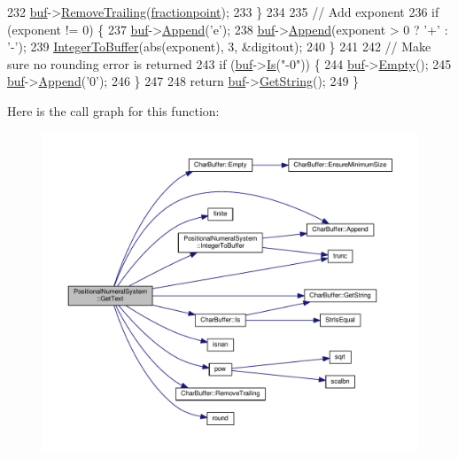 \begin{DoxyCode}
232         \hyperlink{classNumeralSystem_a03e7be944bf3fa5e4c34d80f135cd017}{buf}->\hyperlink{classCharBuffer_a1071772d1059263f4f880965fcc349ab}{RemoveTrailing}(\hyperlink{classPositionalNumeralSystem_ad986e454b020c21e70f2efbc3682e44f}{fractionpoint});
233     \}
234 
235     \textcolor{comment}{// Add exponent}
236     \textcolor{keywordflow}{if} (exponent != 0) \{
237         \hyperlink{classNumeralSystem_a03e7be944bf3fa5e4c34d80f135cd017}{buf}->\hyperlink{classCharBuffer_a045b38735f7b3007c1b98d3d7b7feafe}{Append}(\textcolor{charliteral}{'e'});
238         \hyperlink{classNumeralSystem_a03e7be944bf3fa5e4c34d80f135cd017}{buf}->\hyperlink{classCharBuffer_a045b38735f7b3007c1b98d3d7b7feafe}{Append}(exponent > 0 ? \textcolor{charliteral}{'+'} : \textcolor{charliteral}{'-'});
239         \hyperlink{classPositionalNumeralSystem_ac2edd0c7d5b47dc04908038f3eb03556}{IntegerToBuffer}(abs(exponent), 3, &digitout);
240     \}
241 
242     \textcolor{comment}{// Make sure no rounding error is returned}
243     \textcolor{keywordflow}{if} (\hyperlink{classNumeralSystem_a03e7be944bf3fa5e4c34d80f135cd017}{buf}->\hyperlink{classCharBuffer_a64988275bda43dddb6d2b3b9551cefb0}{Is}(\textcolor{stringliteral}{"-0"})) \{
244         \hyperlink{classNumeralSystem_a03e7be944bf3fa5e4c34d80f135cd017}{buf}->\hyperlink{classCharBuffer_abe39d3fd7d8b9c8ec343af2cae7adc96}{Empty}();
245         \hyperlink{classNumeralSystem_a03e7be944bf3fa5e4c34d80f135cd017}{buf}->\hyperlink{classCharBuffer_a045b38735f7b3007c1b98d3d7b7feafe}{Append}(\textcolor{charliteral}{'0'});
246     \}
247 
248     \textcolor{keywordflow}{return} \hyperlink{classNumeralSystem_a03e7be944bf3fa5e4c34d80f135cd017}{buf}->\hyperlink{classCharBuffer_a7dfd3feaaf80f318ba44efe15b1ec44b}{GetString}();
249 \}
\end{DoxyCode}


Here is the call graph for this function\+:
\nopagebreak
\begin{figure}[H]
\begin{center}
\leavevmode
\includegraphics[width=350pt]{classPositionalNumeralSystem_a2f6ecf8dd5ebff779bd2cba4e356febe_cgraph}
\end{center}
\end{figure}





